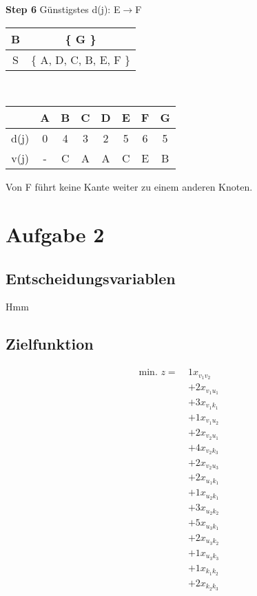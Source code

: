 \documentclass[a4paper,11pt]{article}
\begin{document}
{\begin{multicols}{2}
\textbf{Step 6} Günstigstes d(j): E$\to$F \\
\begin{tabular}{ |c|c| } 
  \hline
  B & \{ G \} \\
  \hline
  S & \{ A, D, C, B, E, F \} \\ 
  \hline
 \end{tabular} \\
\begin{tabular}{ |c|c|c|c|c|c|c|c| } 
  \hline
       & A & B & C & D & E & F & G \\
  \hline
  d(j) & 0 & 4 & 3 & 2 & 5 & 6 & 5 \\
  \hline
  v(j) & - & C & A & A & C & E & B \\
  \hline
\end{tabular}
\vspace{4mm}

Von F führt keine Kante weiter zu einem anderen Knoten.

\end{multicols}}
\vspace{10mm}


\section*{Aufgabe 2}

\subsection*{Entscheidungsvariablen}
Hmm

\subsection*{Zielfunktion}
\begin{align*}
  \text{min. } z =~ 
    &  1x_{v_1 v_2} \\
    &+ 2x_{v_1 u_1} \\
    &+ 3x_{v_1 k_1} \\
    &+ 1x_{v_1 u_2} \\
    &+ 2x_{v_2 u_1} \\
    &+ 4x_{v_2 k_3} \\
    &+ 2x_{v_2 u_3} \\
    &+ 2x_{u_1 k_1} \\
    &+ 1x_{u_2 k_1} \\
    &+ 3x_{u_2 k_2} \\
    &+ 5x_{u_3 k_1} \\
    &+ 2x_{u_3 k_2} \\
    &+ 1x_{u_3 k_3} \\
    &+ 1x_{k_1 k_2} \\
    &+ 2x_{k_2 k_3} \\
\end{align*}
\end{document}
